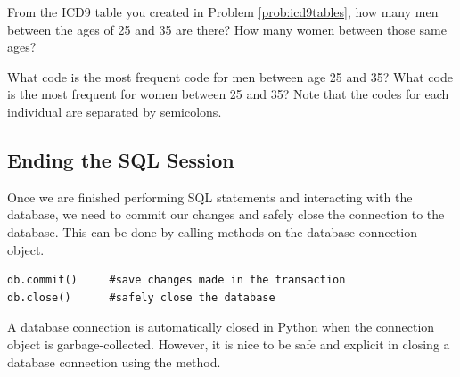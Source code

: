 \begin{problem}
From the ICD9 table you created in Problem \ref{prob:icd9tables}, how many men between the ages of 25 and 35 are there?  How many women between those same ages?

What code is the most frequent code for men between age 25 and 35? What code is the most frequent for women between 25 and 35?  Note that the codes for each individual are separated by semicolons.
\label{prob:youngfreqcodes}
\end{problem}

\subsection*{Ending the SQL Session}
Once we are finished performing SQL statements and interacting with the database, we need to commit our changes and safely close the connection
to the database.
This can be done by calling methods on the database connection object.
\begin{lstlisting}
db.commit()     #save changes made in the transaction
db.close()      #safely close the database
\end{lstlisting}

A database connection is automatically closed in Python when the connection object is garbage-collected.  However, it is nice to be safe and explicit in closing a database connection using the  method.


\let\undefined\lsql 